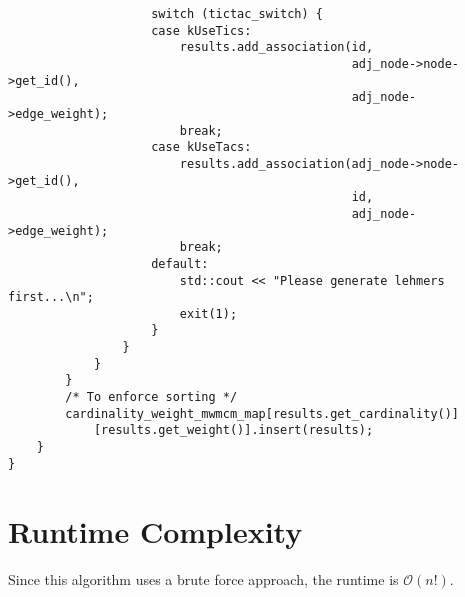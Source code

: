 \documentclass{article}
\begin{document}
{\begin{verbatim}
                    switch (tictac_switch) {
                    case kUseTics:
                        results.add_association(id,
                                                adj_node->node->get_id(),
                                                adj_node->edge_weight);
                        break;
                    case kUseTacs:
                        results.add_association(adj_node->node->get_id(),
                                                id,
                                                adj_node->edge_weight);
                        break;
                    default:
                        std::cout << "Please generate lehmers first...\n";
                        exit(1);
                    }
                }
            }
        }
        /* To enforce sorting */
        cardinality_weight_mwmcm_map[results.get_cardinality()]
            [results.get_weight()].insert(results);
    }
}
\end{verbatim}
}

\section{Runtime Complexity}
Since this algorithm uses a brute force approach, the runtime is $\mathcal{O}(n!)$.
\end{document}
